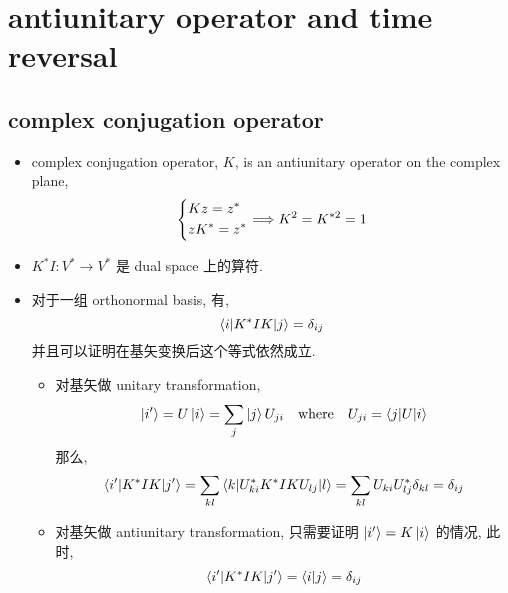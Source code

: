 \chapter{antiunitary operator and time reversal} \label{E}
\section{complex conjugation operator}
\begin{itemize}
	\item complex conjugation operator, $K$, is an antiunitary operator on the complex plane,
	\begin{equation}
		\begin{dcases}
			K z = z^* \\
			z K^* = z^*
		\end{dcases} \Longrightarrow K^2 = K^{* 2} = 1
	\end{equation}
	
	\item $K^* I : V^* \rightarrow V^*$ 是 dual space 上的算符.
	
	\item 对于一组 orthonormal basis, 有,
	\begin{equation}
		\braket{i | K^* I K | j} = \delta_{i j}
	\end{equation}
	并且可以证明在基矢变换后这个等式依然成立.
	
	\begin{tcolorbox}[title=proof:]
		\begin{itemize}
			\item 对基矢做 unitary transformation,
			\begin{equation}
				\ket{i'} = U \ket{i} = \sum_j \ket{j} U_{j i} \quad \text{where} \quad U_{j i} = \braket{j | U | i}
			\end{equation}
			那么,
			\begin{equation}
				\braket{i' | K^* I K | j'} = \sum_{k l} \braket{k | U^*_{k i} K^* I K U_{l j} | l} = \sum_{k l} U_{k i} U^*_{l j} \delta_{k l} = \delta_{i j}
			\end{equation}
			
			\item 对基矢做 antiunitary transformation, 只需要证明 $\ket{i'} = K \ket{i}$ 的情况, 此时,
			\begin{equation}
				\braket{i' | K^* I K | j'} = \braket{i | j} = \delta_{i j}
			\end{equation}
		\end{itemize}
	\end{tcolorbox}
\end{itemize}

